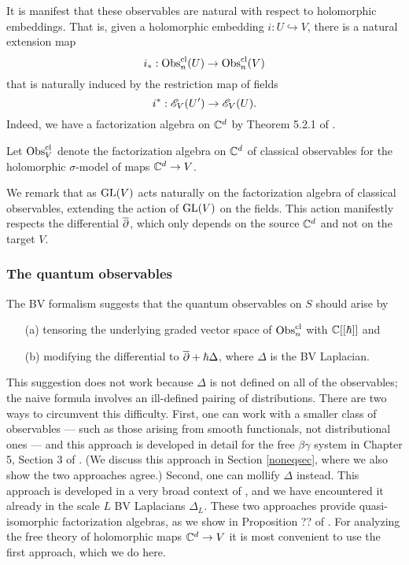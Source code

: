 It is manifest that these observables are natural with respect to holomorphic embeddings.
That is, given a holomorphic embedding $i: U \hookrightarrow V$,
there is a natural extension map
\[
i_*: {\rm Obs}^{\rm cl}_n(U) \to {\rm Obs}^{\rm cl}_n(V)
\]
that is naturally induced by the restriction map of fields
\[
i^*: \mathscr E_V(U') \to \mathscr E_V(U).
\]
Indeed, we have a factorization algebra on $\mathbb C^d$ by Theorem 5.2.1 of \cite{CG1}.

\begin{dfn}
Let ${\rm Obs}^{\rm cl}_V$ denote the factorization algebra on $\mathbb C^d$ of classical observables for the holomorphic $\sigma$-model of maps $\mathbb C^d \to V$.
\end{dfn}

We remark that as ${\rm GL}(V)$ acts naturally on the factorization algebra of classical observables, extending the action of ${\rm GL}(V)$ on the fields.
This action manifestly respects the differential $\overline{\partial}$, which only depends on the source $\mathbb C^d$ and not on the target $V$. 

\subsubsection{The quantum observables}

The BV formalism suggests that the quantum observables on $S$ should arise by 
\begin{enumerate}
\item[(a)] tensoring the underlying graded vector space of ${\rm Obs}^{\rm cl}_n$ with $\mathbb C[[\hbar]]$ and
\item[(b)] modifying the differential to $\overline{\partial} +\hbar \Delta$, where $\Delta$ is the BV Laplacian.
\end{enumerate}
This suggestion does not work because $\Delta$ is not defined on all of the observables;
the naive formula involves an ill-defined pairing of distributions.
There are two ways to circumvent this difficulty. 
First, one can work with a smaller class of observables --- such as those arising from smooth functionals, not distributional ones --- and this approach is developed in detail for the free $\beta\gamma$ system in Chapter 5, Section 3 of \cite{CG1}.
(We discuss this approach in Section \ref{noneqsec}, where we also show the two approaches agree.) 
Second, one can mollify $\Delta$ instead.
This approach is developed in a very broad context of \cite{CG2}, and we have encountered it already in the scale $L$ BV Laplacians $\Delta_L$.
These two approaches provide quasi-isomorphic factorization algebras, 
as we show in Proposition ?? of \cite{GGW}. 
For analyzing the free theory of holomorphic maps $\mathbb C^d \to V$ it is most convenient to use the first approach, which we do here.

